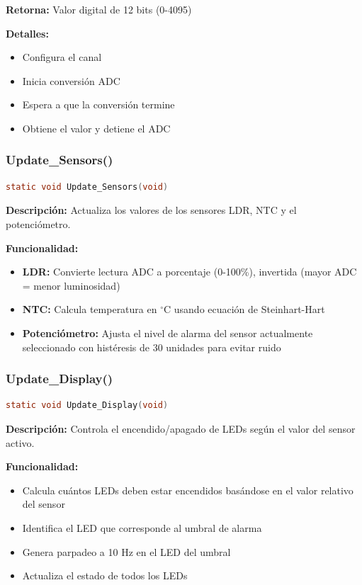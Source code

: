 \documentclass[12pt,a4paper]{article}
\begin{document}
\textbf{Retorna:} Valor digital de 12 bits (0-4095)

\textbf{Detalles:}
\begin{itemize}
    \item Configura el canal
    \item Inicia conversión ADC
    \item Espera a que la conversión termine
    \item Obtiene el valor y detiene el ADC
\end{itemize}

\subsubsection{Update\_Sensors()}
\begin{lstlisting}[language=C, caption=Actualización de valores de sensores]
static void Update_Sensors(void)
\end{lstlisting}

\textbf{Descripción:} Actualiza los valores de los sensores LDR, NTC y el potenciómetro.

\textbf{Funcionalidad:}
\begin{itemize}
    \item \textbf{LDR:} Convierte lectura ADC a porcentaje (0-100\%), invertida (mayor ADC = menor luminosidad)
    \item \textbf{NTC:} Calcula temperatura en $^\circ$C usando ecuación de Steinhart-Hart
    \item \textbf{Potenciómetro:} Ajusta el nivel de alarma del sensor actualmente seleccionado con histéresis de 30 unidades para evitar ruido
\end{itemize}

\subsubsection{Update\_Display()}
\begin{lstlisting}[language=C, caption=Actualización de visualización en LEDs]
static void Update_Display(void)
\end{lstlisting}

\textbf{Descripción:} Controla el encendido/apagado de LEDs según el valor del sensor activo.

\textbf{Funcionalidad:}
\begin{itemize}
    \item Calcula cuántos LEDs deben estar encendidos basándose en el valor relativo del sensor
    \item Identifica el LED que corresponde al umbral de alarma
    \item Genera parpadeo a 10 Hz en el LED del umbral
    \item Actualiza el estado de todos los LEDs
\end{itemize}
\end{document}
